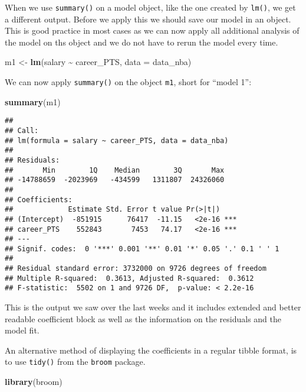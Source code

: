 \documentclass[
]{book}
\newenvironment{Shaded}{\begin{snugshade}}{\end{snugshade}}
\newcommand{\AttributeTok}[1]{\textcolor[rgb]{0.13,0.29,0.53}{#1}}
\newcommand{\FunctionTok}[1]{\textcolor[rgb]{0.13,0.29,0.53}{\textbf{#1}}}
\newcommand{\NormalTok}[1]{#1}
\newcommand{\OtherTok}[1]{\textcolor[rgb]{0.56,0.35,0.01}{#1}}
\newcommand{\SpecialCharTok}[1]{\textcolor[rgb]{0.81,0.36,0.00}{\textbf{#1}}}
\begin{document}
When we use \texttt{summary()} on a model object, like the one created by \texttt{lm()}, we
get a different output. Before we apply this we should save our model in an
object. This is good practice in most cases as we can now apply all additional
analysis of the model on ths object and we do not have to rerun the model
every time.

\begin{Shaded}
\begin{Highlighting}[]
\NormalTok{m1 }\OtherTok{\textless{}{-}} \FunctionTok{lm}\NormalTok{(salary }\SpecialCharTok{\textasciitilde{}}\NormalTok{ career\_PTS, }\AttributeTok{data =}\NormalTok{ data\_nba)}
\end{Highlighting}
\end{Shaded}

We can now apply \texttt{summary()} on the object \texttt{m1}, short for ``model 1'':

\begin{Shaded}
\begin{Highlighting}[]
\FunctionTok{summary}\NormalTok{(m1)}
\end{Highlighting}
\end{Shaded}

\begin{verbatim}
## 
## Call:
## lm(formula = salary ~ career_PTS, data = data_nba)
## 
## Residuals:
##       Min        1Q    Median        3Q       Max 
## -14788659  -2023969   -434599   1311807  24326060 
## 
## Coefficients:
##             Estimate Std. Error t value Pr(>|t|)    
## (Intercept)  -851915      76417  -11.15   <2e-16 ***
## career_PTS    552843       7453   74.17   <2e-16 ***
## ---
## Signif. codes:  0 '***' 0.001 '**' 0.01 '*' 0.05 '.' 0.1 ' ' 1
## 
## Residual standard error: 3732000 on 9726 degrees of freedom
## Multiple R-squared:  0.3613, Adjusted R-squared:  0.3612 
## F-statistic:  5502 on 1 and 9726 DF,  p-value: < 2.2e-16
\end{verbatim}

This is the output we saw over the last weeks and it includes extended and
better readable coefficient block as well as the information on the residuals
and the model fit.

An alternative method of displaying the coefficients in a regular tibble format,
is to use \texttt{tidy()} from the \texttt{broom} package.

\begin{Shaded}
\begin{Highlighting}[]
\FunctionTok{library}\NormalTok{(broom)}
\end{Highlighting}
\end{Shaded}
\end{document}
